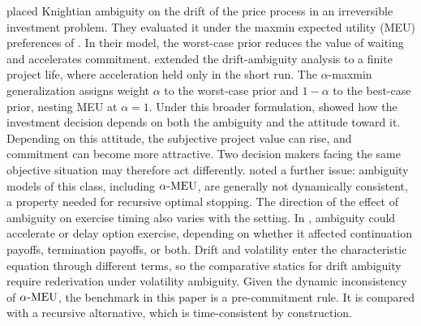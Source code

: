 \citet{NishimuraOzaki2007} placed Knightian ambiguity on the drift of the price process in an irreversible investment problem. They evaluated it under the maxmin expected utility (MEU) preferences of \citet{GilboaSchmeidler1989}. In their model, the worst-case prior reduces the value of waiting and accelerates commitment. \citet{TrojanowskaKort2010} extended the drift-ambiguity analysis to a finite project life, where acceleration held only in the short run. The $\alpha$-maxmin generalization \citep{Ghirardato2004} assigns weight $\alpha$ to the worst-case prior and $1-\alpha$ to the best-case prior, nesting MEU at $\alpha=1$. Under this broader formulation, \citet{Schroder2011} showed how the investment decision depends on both the ambiguity and the attitude toward it. Depending on this attitude, the subjective project value can rise, and commitment can become more attractive. Two decision makers facing the same objective situation may therefore act differently. \citet{Schroder2020} noted a further issue: ambiguity models of this class, including $\alpha\text{-MEU}$, are generally not dynamically consistent, a property needed for recursive optimal stopping. The direction of the effect of ambiguity on exercise timing also varies with the setting. In \citet{MiaoWang2011}, ambiguity could accelerate or delay option exercise, depending on whether it affected continuation payoffs, termination payoffs, or both. Drift and volatility enter the characteristic equation through different terms, so the comparative statics for drift ambiguity require rederivation under volatility ambiguity. Given the dynamic inconsistency of $\alpha\text{-MEU}$, the benchmark in this paper is a pre-commitment rule. It is compared with a recursive alternative, which is time-consistent by construction.

